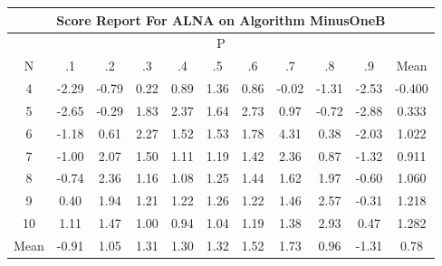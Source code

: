 \documentclass[11pt,a4paper]{report}
\begin{document}
\begin{longtable}{ | c || c | c | c | c | c | c | c | c | c || c |}
\hline
\multicolumn{11}{|c|}{ Score Report For ALNA on Algorithm MinusOneB} \\
\hline
\multicolumn{11}{|c|}{ P } \\
\hline
N & .1 & .2 & .3 & .4 & .5 & .6 & .7 & .8 & .9 & Mean\\
 \hline
 \hline
 \endhead
  4 &  \cellcolor[HTML]{FFC7C7} -2.29 &  \cellcolor[HTML]{FFEFEF} -0.79 &  \cellcolor[HTML]{F7F7FF} 0.22 &  \cellcolor[HTML]{E7E7FF} 0.89 &  \cellcolor[HTML]{DFDFFF} 1.36 &  \cellcolor[HTML]{E7E7FF} 0.86 &  \cellcolor[HTML]{FFFFFF} -0.02 &  \cellcolor[HTML]{FFDFDF} -1.31 &  \cellcolor[HTML]{FFBFBF} -2.53 & -0.400 \\
  5 &  \cellcolor[HTML]{FFBFBF} -2.65 &  \cellcolor[HTML]{FFF7F7} -0.29 &  \cellcolor[HTML]{CFCFFF} 1.83 &  \cellcolor[HTML]{C7C7FF} 2.37 &  \cellcolor[HTML]{D7D7FF} 1.64 &  \cellcolor[HTML]{B7B7FF} 2.73 &  \cellcolor[HTML]{E7E7FF} 0.97 &  \cellcolor[HTML]{FFEFEF} -0.72 &  \cellcolor[HTML]{FFB7B7} -2.88 & 0.333 \\
  6 &  \cellcolor[HTML]{FFDFDF} -1.18 &  \cellcolor[HTML]{EFEFFF} 0.61 &  \cellcolor[HTML]{C7C7FF} 2.27 &  \cellcolor[HTML]{D7D7FF} 1.52 &  \cellcolor[HTML]{D7D7FF} 1.53 &  \cellcolor[HTML]{CFCFFF} 1.78 &  \cellcolor[HTML]{8F8FFF} 4.31 &  \cellcolor[HTML]{F7F7FF} 0.38 &  \cellcolor[HTML]{FFCFCF} -2.03 & 1.022 \\
  7 &  \cellcolor[HTML]{FFE7E7} -1.00 &  \cellcolor[HTML]{C7C7FF} 2.07 &  \cellcolor[HTML]{D7D7FF} 1.50 &  \cellcolor[HTML]{E7E7FF} 1.11 &  \cellcolor[HTML]{DFDFFF} 1.19 &  \cellcolor[HTML]{DFDFFF} 1.42 &  \cellcolor[HTML]{C7C7FF} 2.36 &  \cellcolor[HTML]{E7E7FF} 0.87 &  \cellcolor[HTML]{FFDFDF} -1.32 & 0.911 \\
  8 &  \cellcolor[HTML]{FFEFEF} -0.74 &  \cellcolor[HTML]{C7C7FF} 2.36 &  \cellcolor[HTML]{DFDFFF} 1.16 &  \cellcolor[HTML]{E7E7FF} 1.08 &  \cellcolor[HTML]{DFDFFF} 1.25 &  \cellcolor[HTML]{D7D7FF} 1.44 &  \cellcolor[HTML]{D7D7FF} 1.62 &  \cellcolor[HTML]{CFCFFF} 1.97 &  \cellcolor[HTML]{FFEFEF} -0.60 & 1.060 \\
  9 &  \cellcolor[HTML]{F7F7FF} 0.40 &  \cellcolor[HTML]{CFCFFF} 1.94 &  \cellcolor[HTML]{DFDFFF} 1.21 &  \cellcolor[HTML]{DFDFFF} 1.22 &  \cellcolor[HTML]{DFDFFF} 1.26 &  \cellcolor[HTML]{DFDFFF} 1.22 &  \cellcolor[HTML]{D7D7FF} 1.46 &  \cellcolor[HTML]{BFBFFF} 2.57 &  \cellcolor[HTML]{FFF7F7} -0.31 & 1.218 \\
  10 &  \cellcolor[HTML]{E7E7FF} 1.11 &  \cellcolor[HTML]{D7D7FF} 1.47 &  \cellcolor[HTML]{E7E7FF} 1.00 &  \cellcolor[HTML]{E7E7FF} 0.94 &  \cellcolor[HTML]{E7E7FF} 1.04 &  \cellcolor[HTML]{DFDFFF} 1.19 &  \cellcolor[HTML]{DFDFFF} 1.38 &  \cellcolor[HTML]{B7B7FF} 2.93 &  \cellcolor[HTML]{F7F7FF} 0.47 & 1.282 \\
 \hline
 \hline
Mean &  \cellcolor[HTML]{FFE7E7} -0.91 &  \cellcolor[HTML]{E7E7FF} 1.05 &  \cellcolor[HTML]{DFDFFF} 1.31 &  \cellcolor[HTML]{DFDFFF} 1.30 &  \cellcolor[HTML]{DFDFFF} 1.32 &  \cellcolor[HTML]{D7D7FF} 1.52 &  \cellcolor[HTML]{D7D7FF} 1.73 &  \cellcolor[HTML]{E7E7FF} 0.96 &  \cellcolor[HTML]{FFDFDF} -1.31 &  \cellcolor[HTML]{EFEFFF} 0.78
\end{longtable}
\end{document}
